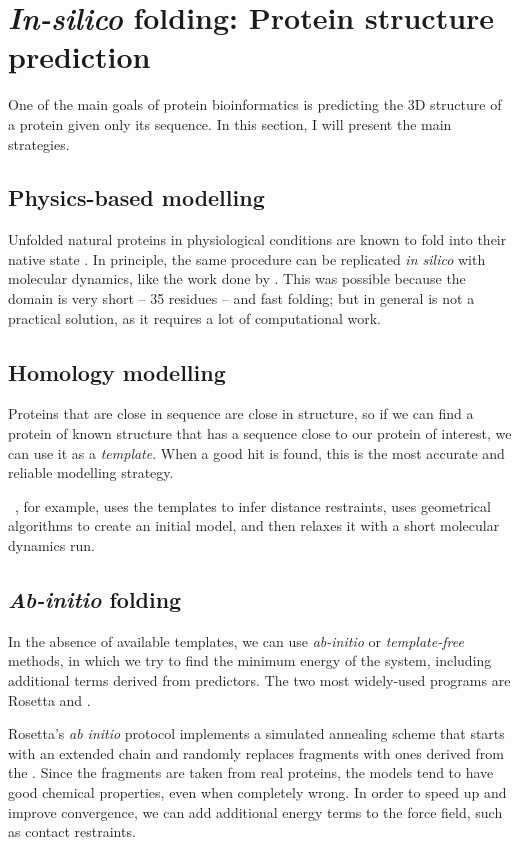 \section[Protein structure prediction]{\emph{In-silico} folding: Protein structure prediction}
One of the main goals of protein bioinformatics is predicting the 3D structure of a protein given only its sequence.
In this section, I will present the main strategies.

\subsection{Physics-based modelling}
Unfolded natural proteins in physiological conditions are known to fold into their native state \citep{fold_graciously}.
In principle, the same procedure can be replicated \emph{in silico} with molecular dynamics, like the work done by \citet{physics_folding}.
This was possible because the domain is very short -- 35 residues -- and fast folding; but in general is not a practical solution, as it requires a lot of computational work.

\subsection{Homology modelling}
Proteins that are close in sequence are close in structure, so if we can find a protein of known structure that has a sequence close to our protein of interest, we can use it as a \emph{template}.
When a good hit is found, this is the most accurate and reliable modelling strategy.

\MODELLER~\citep{modeller}, for example, uses the templates to infer distance restraints, uses geometrical algorithms to create an initial model, and then relaxes it with a short molecular dynamics run.


\subsection{\emph{Ab-initio} folding}
In the absence of available templates, we can use \emph{ab-initio} or \emph{template-free} methods, in which we try to find the minimum energy of the system, including additional terms derived from predictors.
The two most widely-used programs are Rosetta and \CONFOLD.

Rosetta's \citep{Rosetta3}  \emph{ab initio} protocol implements a simulated annealing scheme that starts with an extended chain and randomly replaces fragments with ones derived from the \PDB.
Since the fragments are taken from real proteins, the models tend to have good chemical properties, even when completely wrong.
In order to speed up and improve convergence, we can add additional energy terms to the force field, such as contact restraints.

